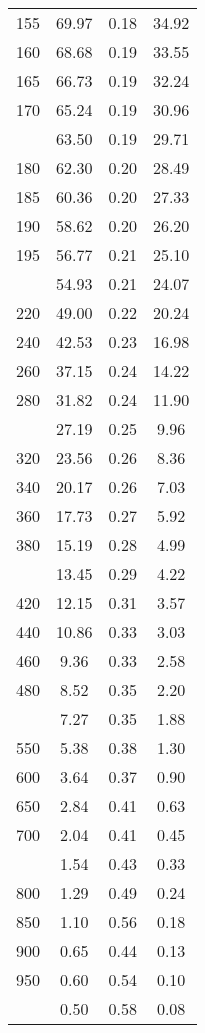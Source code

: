\begin{table}[ht]
\begin{tabular}{lccc}
  155 & 69.97 & 0.18 & 34.92 \\ 
  160 & 68.68 & 0.19 & 33.55 \\ 
  165 & 66.73 & 0.19 & 32.24 \\ 
  170 & 65.24 & 0.19 & 30.96 \\ 
   \addlinespace
175 & 63.50 & 0.19 & 29.71 \\ 
  180 & 62.30 & 0.20 & 28.49 \\ 
  185 & 60.36 & 0.20 & 27.33 \\ 
  190 & 58.62 & 0.20 & 26.20 \\ 
  195 & 56.77 & 0.21 & 25.10 \\ 
   \addlinespace
200 & 54.93 & 0.21 & 24.07 \\ 
  220 & 49.00 & 0.22 & 20.24 \\ 
  240 & 42.53 & 0.23 & 16.98 \\ 
  260 & 37.15 & 0.24 & 14.22 \\ 
  280 & 31.82 & 0.24 & 11.90 \\ 
   \addlinespace
300 & 27.19 & 0.25 & 9.96 \\ 
  320 & 23.56 & 0.26 & 8.36 \\ 
  340 & 20.17 & 0.26 & 7.03 \\ 
  360 & 17.73 & 0.27 & 5.92 \\ 
  380 & 15.19 & 0.28 & 4.99 \\ 
   \addlinespace
400 & 13.45 & 0.29 & 4.22 \\ 
  420 & 12.15 & 0.31 & 3.57 \\ 
  440 & 10.86 & 0.33 & 3.03 \\ 
  460 & 9.36 & 0.33 & 2.58 \\ 
  480 & 8.52 & 0.35 & 2.20 \\ 
   \addlinespace
500 & 7.27 & 0.35 & 1.88 \\ 
  550 & 5.38 & 0.38 & 1.30 \\ 
  600 & 3.64 & 0.37 & 0.90 \\ 
  650 & 2.84 & 0.41 & 0.63 \\ 
  700 & 2.04 & 0.41 & 0.45 \\ 
   \addlinespace
750 & 1.54 & 0.43 & 0.33 \\ 
  800 & 1.29 & 0.49 & 0.24 \\ 
  850 & 1.10 & 0.56 & 0.18 \\ 
  900 & 0.65 & 0.44 & 0.13 \\ 
  950 & 0.60 & 0.54 & 0.10 \\ 
   \addlinespace
1000 & 0.50 & 0.58 & 0.08 \\ 
   \bottomrule
\end{tabular}
\end{table}
